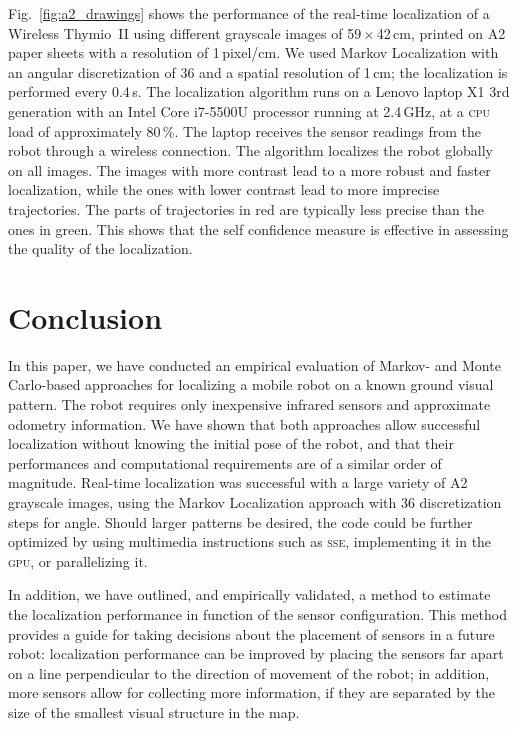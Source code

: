 \documentclass{svmult}
\newcommand{\Fig}[1]{Fig.~\ref{fig:#1}}
\begin{document}
\Fig{a2_drawings} shows the performance of the real-time localization of a Wireless Thymio~II using different grayscale images of 59\,$\times$\,42\,cm, printed on A2 paper sheets with a resolution of 1\,pixel/cm.
We used Markov Localization with an angular discretization of 36 and a spatial resolution of 1\,cm; the localization is performed every 0.4\,s.
The localization algorithm runs on a Lenovo laptop X1 3rd generation with an Intel Core i7-5500U processor running at 2.4\,GHz, at a \textsc{cpu} load of approximately 80\,\%.
The laptop receives the sensor readings from the robot through a wireless connection.
The algorithm localizes the robot globally on all images.
The images with more contrast lead to a more robust and faster localization, while the ones with lower contrast lead to more imprecise trajectories.
The parts of trajectories in red are typically less precise than the ones in green.
This shows that the self confidence measure is effective in assessing the quality of the localization.

\section{Conclusion}

In this paper, we have conducted an empirical evaluation of Markov- and Monte Carlo-based approaches for localizing a mobile robot on a known ground visual pattern.
The robot requires only inexpensive infrared sensors and approximate odometry information.
We have shown that both approaches allow successful localization without knowing the initial pose of the robot, and that their performances and computational requirements are of a similar order of magnitude.
Real-time localization was successful with a large variety of A2 grayscale images, using the Markov Localization approach with 36 discretization steps for angle.
Should larger patterns be desired, the code could be further optimized by using multimedia instructions such as \textsc{sse}, implementing it in the \textsc{gpu}, or parallelizing it.

In addition, we have outlined, and empirically validated, a method to estimate the localization performance in function of the sensor configuration.
This method provides a guide for taking decisions about the placement of sensors in a future robot:
localization performance can be improved by placing the sensors far apart on a line perpendicular to the direction of movement of the robot; in addition, more sensors allow for collecting more information, if they are separated by the size of the smallest visual structure in the map.
\end{document}
